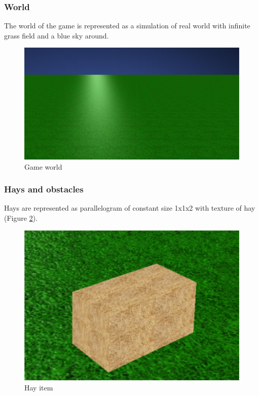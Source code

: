 \documentclass[12pt]{article}
\begin{document}
\subsubsection{World}
The world of the game is represented as a simulation of real world with infinite grass field and a blue sky around.

\begin{figure}[h!]
\begin{center}
\includegraphics[scale=0.4]{images/env.jpg}
\end{center}
\caption{Game world}
\label{world}
\end{figure}

\subsubsection{Hays and obstacles}
Hays are represented as parallelogram of constant size 1x1x2 with texture of hay (Figure \ref{hay_item}).

\begin{figure}[h!]
\begin{center}
\includegraphics[scale=0.8]{images/hay.png}
\end{center}
\caption{Hay item}
\label{hay_item}
\end{figure}
\end{document}
